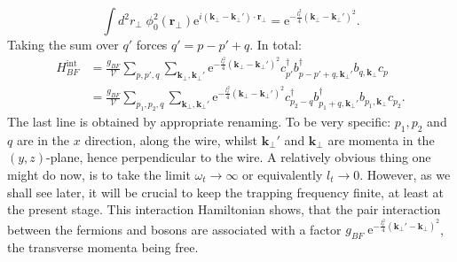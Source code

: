 \begin{equation}
\int d^2 r_\perp \; \phi^2_0(\mathbf{r}_{\perp})\text{e}^{i(\mathbf{k}_{\perp}-\mathbf{k}_{\perp}')\cdot \mathbf{r}_\perp} = \text{e}^{-\frac{l_t^2}{4}(\mathbf{k}_{\perp}-\mathbf{k}_{\perp}')^2}. \nonumber
\end{equation}
Taking the sum over $q'$ forces $q' = p-p' + q$. In total:
\begin{align}
H_{BF}^\text{int} &= \frac{g_{BF}}{\mathcal{V}}\sum_{p,p',q} \sum_{\mathbf{k}_\perp, \mathbf{k}_\perp'} \text{e}^{-\frac{l_t^2}{4}(\mathbf{k}_\perp-\mathbf{k}_\perp')^2} c^\dagger_{p'} b^\dagger_{p-p'+q, \mathbf{k}_\perp'} b_{q,\mathbf{k}_\perp}c_{p} \nonumber \\
                  &= \frac{g_{BF}}{\mathcal{V}}\sum_{p_1,p_2,q} \sum_{\mathbf{k}_\perp, \mathbf{k}_\perp'} \text{e}^{-\frac{l_t^2}{4}(\mathbf{k}_\perp-\mathbf{k}_\perp')^2} c_{p_2-q}^\dagger b_{p_1+q, \mathbf{k}_\perp'}^\dagger b_{p_1,\mathbf{k}_\perp}c_{p_2}.
\end{align}
The last line is obtained by appropriate renaming. To be very specific: $p_1,p_2$ and $q$ are in the $x$ direction, along the wire, whilst $\mathbf{k}_\perp'$ and $\mathbf{k}_\perp$ are momenta in the $(y,z)$-plane, hence perpendicular to the wire. A relatively obvious thing one might do now, is to take the limit $\omega_t \to \infty$ or equivalently $l_t \to 0$. However, as we shall see later, it will be crucial to keep the trapping frequency finite, at least at the present stage. This interaction Hamiltonian shows, that the pair interaction between the fermions and bosons are associated with a factor $g_{BF}\; \text{e}^{-\frac{l_t^2}{4}(\mathbf{k}_\perp'-\mathbf{k}_\perp)^2}$, the transverse momenta being free. 

